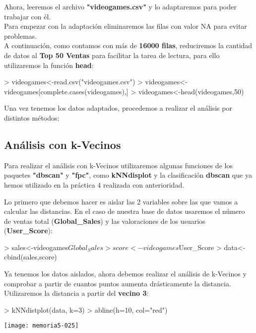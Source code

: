 \documentclass [a4paper] {article}
\begin{document}
Ahora, leeremos el archivo \textbf{"videogames.csv"} y lo adaptaremos para poder trabajar con él.\\
Para empezar con la adaptación eliminaremos las filas con valor NA para evitar problemas.\\
A continuación, como contamos con más de \textbf{16000 filas}, reduciremos la cantidad de datos al 
\textbf{Top 50 Ventas} para facilitar la tarea de lectura, para ello utilizaremos la función \textbf{head}:

\begin{Schunk}
\begin{Sinput}
> videogames<-read.csv("videogames.csv")
> videogames<-videogames[complete.cases(videogames),]
> videogames<-head(videogames,50)
\end{Sinput}
\end{Schunk}

Una vez tenemos los datos adaptados, procedemos a realizar el análisis por distintos métodos:

\subsection{Análisis con k-Vecinos}

Para realizar el análisis con k-Vecinos utilizaremos algunas funciones de los paquetes \textbf{"dbscan"} y
\textbf{"fpc"}, como \textbf{kNNdisplot} y la clasificación \textbf{dbscan} que ya hemos utilizado en la práctica
4 realizada con anterioridad.

Lo primero que debemos hacer es aislar las 2 variables sobre las que vamos a calcular las distancias. En el caso
de nuestra base de datos usaremos el número de ventas total (\textbf{Global\_Sales}) y las valoraciones de los
usuarios (\textbf{User\_Score}):

\begin{Schunk}
\begin{Sinput}
> sales<-videogames$Global_Sales
> score<-videogames$User_Score
> data<-cbind(sales,score)
\end{Sinput}
\end{Schunk}

Ya tenemos los datos aislados, ahora debemos realizar el análisis de k-Vecinos y comprobar a partir de cuantos puntos
aumenta drásticamente la distancia. Utilizaremos la distancia a partir del \textbf{vecino 3}:

\begin{Schunk}
\begin{Sinput}
> kNNdistplot(data, k=3)
> abline(h=10, col="red")
\end{Sinput}
\end{Schunk}
\texttt{[image: memoria5-025]}
\end{document}
